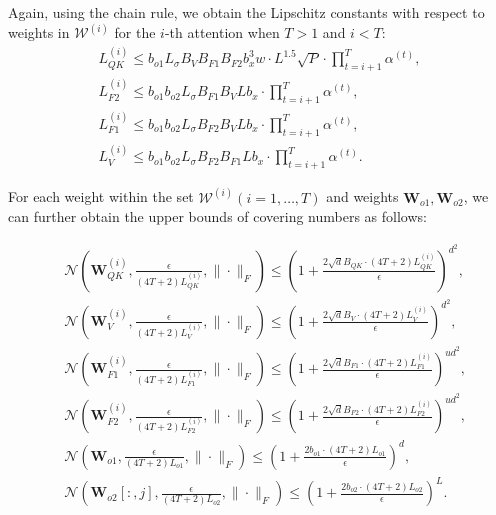 \documentclass[lettersize,onecolumn]{IEEEtran}
\begin{document}
Again, using the chain rule, we obtain the Lipschitz constants with respect to weights in $\mathcal{W}^{(i)}$ for the $i$-th attention when $T>1$ and $i<T$:
\begin{gather}
    L_{Q K}^{(i)} \leq b_{o 1}L_{\sigma} B_{V} B_{F 1} B_{F 2}b_{x}^{3}w \cdot L^{1.5} \sqrt{P} \cdot\prod_{t=i+1}^{T}\alpha^{(t)}, \label{eq: L_QK, i-th layer} \\
     L_{F2}^{(i)}  \leq b_{o1}b_{o2} L_{\sigma} B_{F 1} B_{V} L b_{x} \cdot\prod_{t=i+1}^{T}\alpha^{(t)}, \\
     L_{F1}^{(i)} \leq b_{o1}b_{o2} L_{\sigma} B_{F 2} B_{V} L b_{x} \cdot\prod_{t=i+1}^{T}\alpha^{(t)}, \\
     L_{V}^{(i)} \leq b_{o1}b_{o2} L_{\sigma} B_{F 2} B_{F 1} L b_{x} \cdot\prod_{t=i+1}^{T}\alpha^{(t)}. \label{eq: L_V, i-th layer}
\end{gather}

For each weight within the set $\mathcal{W}^{(i)}(i=1,\ldots,T)$ and weights $\mathbf{W}_{o1}, \mathbf{W}_{o2}$, we can further obtain the upper bounds of covering numbers as follows:

\begin{align}
    &\mathcal{N}\left(\mathbf{W}_{QK}^{(i)}, \frac{\epsilon}{(4T+2) L_{QK}^{(i)}}, \| \cdot \|_{F}\right) \leq\left(1+\frac{2 \sqrt{d} B_{QK} \cdot (4T+2) L_{QK}^{(i)}}{\epsilon}\right)^{d^{2}},\label{eq: covering number of QK, i-th layer, multi-layer}\\
    &\mathcal{N}\left(\mathbf{W}_{V}^{(i)}, \frac{\epsilon}{(4T+2) L_{V}^{(i)}}, \| \cdot \|_{F}\right) \leq\left(1+\frac{2 \sqrt{d} B_{V} \cdot (4T+2) L_{V}^{(i)}}{\epsilon}\right)^{d^{2}},\\
    &\mathcal{N}\left(\mathbf{W}_{F1}^{(i)}, \frac{\epsilon}{(4T+2) L_{F1}^{(i)}}, \| \cdot \|_{F}\right) \leq\left(1+\frac{2 \sqrt{d} B_{F1} \cdot (4T+2) L_{F1}^{(i)}}{\epsilon}\right)^{ud^{2}}, \\
    &\mathcal{N}\left(\mathbf{W}_{F2}^{(i)}, \frac{\epsilon}{(4T+2) L_{F2}^{(i)}}, \| \cdot \|_{F}\right) \leq\left(1+\frac{2 \sqrt{d} B_{F2} \cdot (4T+2) L_{F2}^{(i)}}{\epsilon}\right)^{ud^{2}},\\
    &\mathcal{N}\left(\mathbf{W}_{o1}, \frac{\epsilon}{(4T+2) L_{o1}}, \| \cdot \|_{F}\right) \leq\left(1+\frac{2 b_{o1} \cdot (4T+2) L_{o1}}{\epsilon}\right)^{d}, \label{eq: covering number of o1, multi-layer}\\
    &\mathcal{N}\left(\mathbf{W}_{o2}[:,j], \frac{\epsilon}{(4T+2) L_{o2}}, \| \cdot \|_{F}\right) \leq\left(1+\frac{2 b_{o2} \cdot (4T+2) L_{o2}}{\epsilon}\right)^{L}.\label{eq: covering number of o2, multi-layer}
\end{align}
\end{document}
